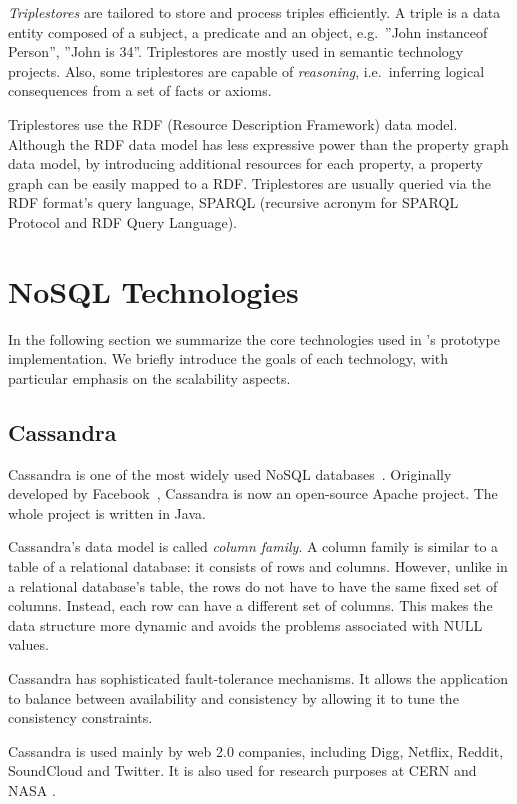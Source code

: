\textit{Triplestores} are tailored to store and process triples efficiently. A triple is a data entity composed of a subject, a predicate and an object, e.g.\ ''John instanceof Person'', ''John is 34''. Triplestores are mostly used in semantic technology projects. Also, some triplestores are capable of \emph{reasoning}, i.e.\ inferring logical consequences from a set of facts or axioms. 

Triplestores use the RDF (Resource Description Framework) data model. Although the RDF data model has less expressive power than the property graph data model, by introducing additional resources for each property, a property graph can be easily mapped to a RDF. Triplestores are usually queried via the RDF format's query language, SPARQL (recursive acronym for SPARQL Protocol and RDF Query Language). 

\section{NoSQL Technologies}

In the following section we summarize the core technologies used in \iqd{}'s prototype implementation. We briefly introduce the goals of each technology, with particular emphasis on the scalability aspects.
 
\subsection{Cassandra}

Cassandra is one of the most widely used NoSQL databases~\cite{Cassandra}. Originally developed by Facebook~\cite{Lakshman:2010:CDS:1773912.1773922}, Cassandra is now an open-source Apache project. The whole project is written in Java.

Cassandra's data model is called \emph{column family}. A column family is similar to a table of a relational database: it consists of rows and columns. However, unlike in a relational database's table, the rows do not have to have the same fixed set of columns. Instead, each row can have a different set of columns. This makes the data structure more dynamic and avoids the problems associated with NULL values.

Cassandra has sophisticated fault-tolerance mechanisms. It allows the application to balance between availability and consistency by allowing it to tune the consistency constraints.

Cassandra is used mainly by web 2.0 companies, including Digg, Netflix, Reddit, SoundCloud and Twitter. It is also used for research purposes at CERN and NASA \cite{CassandraCompanies}.

